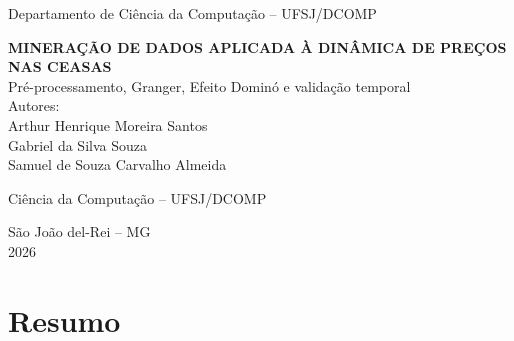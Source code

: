 \documentclass[12pt,a4paper]{article}
\begin{document}


\begin{titlepage}
    \centering
    \normalsize
    Departamento de Ciência da Computação -- UFSJ/DCOMP\\

    \vspace*{5cm}

    {\large
        \textbf{\MakeUppercase{Mineração de dados aplicada à dinâmica de
        preços nas CEASAs}}
    }\\[0.5cm]

    {\normalsize
        Pré-processamento, Granger, Efeito Dominó e validação temporal
    }\\[2cm]

    {\normalsize
        Autores:\\[0.3cm]
        Arthur Henrique Moreira Santos\\
        Gabriel da Silva Souza\\
        Samuel de Souza Carvalho Almeida\\
    }

    \vspace{0.5cm}
    {\normalsize Ciência da Computação -- UFSJ/DCOMP}

    \vfill

    {\large São João del-Rei -- MG}\\
    {\large 2026}
\end{titlepage}

\tableofcontents
\newpage
{}


\section*{Resumo}
\end{document}
